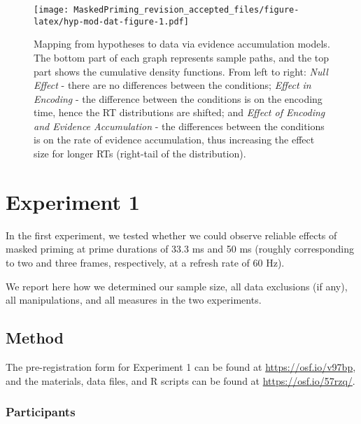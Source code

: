 \documentclass[
  english,
  man,floatsintext]{apa6}
\begin{document}
\newpage

\begin{figure}
\centering
\texttt{[image: MaskedPriming\_revision\_accepted\_files/figure-latex/hyp-mod-dat-figure-1.pdf]}
\caption{\label{fig:hyp-mod-dat-figure}Mapping from hypotheses to data via evidence accumulation models. The bottom part of each graph represents sample paths, and the top part shows the cumulative density functions. From left to right: \emph{Null Effect} - there are no differences between the conditions; \emph{Effect in Encoding} - the difference between the conditions is on the encoding time, hence the RT distributions are shifted; and \emph{Effect of Encoding and Evidence Accumulation} - the differences between the conditions is on the rate of evidence accumulation, thus increasing the effect size for longer RTs (right-tail of the distribution).}
\end{figure}

\hypertarget{experiment-1}{%
\section{Experiment 1}\label{experiment-1}}

In the first experiment, we tested whether we could observe reliable effects of masked priming at prime durations of 33.3 ms and 50 ms (roughly corresponding to two and three frames, respectively, at a refresh rate of 60 Hz).

We report here how we determined our sample size, all data exclusions (if any), all manipulations, and all measures in the two experiments.

\hypertarget{method}{%
\subsection{Method}\label{method}}

The pre-registration form for Experiment 1 can be found at \url{https://osf.io/v97bp}, and the materials, data files, and R scripts can be found at \url{https://osf.io/57rzq/}.

\hypertarget{participants}{%
\subsubsection{Participants}\label{participants}}
\end{document}
